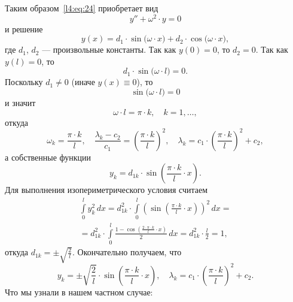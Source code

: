 Таким образом~\eqref{l4:eq:24} приобретает вид
\begin{equation*}
	 y''+\omega^2\cdot y=0
\end{equation*}  
и решение
\begin{equation*}
	 y(x)=d_1\cdot\sin\big(\omega\cdot x\big)+d_2\cdot\cos\big(\omega\cdot x\big),
\end{equation*}
где $d_1$, $d_2$ --- произвольные константы. Так как $y(0)=0$, то $d_2=0$. Так как $y(l)=0$, то
\begin{equation*}
	d_1\cdot\sin\big(\omega\cdot l\big)=0.
\end{equation*}
Поскольку $d_1\neq0$ (иначе $y(x)\equiv0$), то
\begin{equation*}
	\sin\big(\omega\cdot l\big)=0
\end{equation*}
и значит
\begin{equation*}
	\omega\cdot l=\pi\cdot k,\quad k=1,\ldots,
\end{equation*} 
откуда
\begin{equation*}
	\omega_k=\frac{\pi\cdot k}{l},\quad \frac{\lambda_k-c_2}{c_1}=\left(\frac{\pi\cdot k}{l}\right)^2,\quad\lambda_k=c_1\cdot\left(\frac{\pi\cdot k}{l}\right)^2+c_2,
\end{equation*}
а собственные функции 
\begin{equation*}
	y_k=d_{1k}\cdot\sin\left(\frac{\pi\cdot k}{l}\cdot x\right).
\end{equation*} 
Для выполнения изопериметрического условия считаем
\begin{multline*}
	\int\limits_0^l y_k^2\,dx=d_{1k}^2\cdot\int\limits_0^l\left(\sin\left(\frac{\pi\cdot k}{l}\cdot x\right)\right)^2\,dx=\\=d_{1k}^2\cdot\int\limits_0^l\frac{1-\cos\left(\frac{2\cdot\pi\cdot k}{l}\cdot x\right)}{2}\,dx=d_{1k}^2\cdot\frac{l}{2}=1,
\end{multline*}
откуда $d_{1k}=\pm\displaystyle\sqrt{\frac{2}{l}}$. Окончательно получаем, что
\begin{equation*}
	 y_k=\pm\sqrt{\frac{2}{l}}\cdot\sin\left(\frac{\pi\cdot k}{l}\cdot x\right),\quad\lambda_k=c_1\cdot\left(\frac{\pi\cdot k}{l}\right)^2+c_2.
\end{equation*}
Что мы узнали в нашем частном случае:
